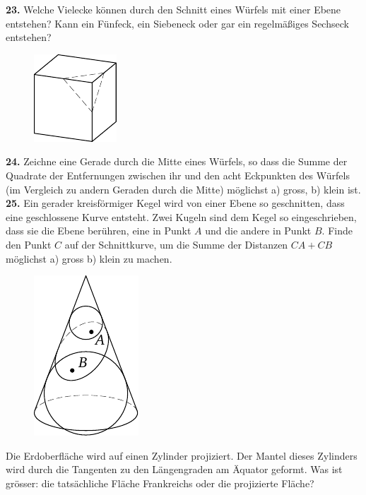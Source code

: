 \documentclass[12pt]{article} %
\begin{document}
\newpage
\noindent
{\bf 23.} Welche Vielecke können durch den Schnitt eines Würfels mit einer Ebene entstehen? Kann ein Fünfeck, ein Siebeneck oder gar ein regelmäßiges Sechseck entstehen? 
\begin{figure}[h]
\centering
\footnotesize
\includegraphics[scale=1]{taskbook-7}
\end{figure}
\newline\newline\quad
{\bf 24.} Zeichne eine Gerade durch die Mitte eines Würfels, so dass die Summe der Quadrate der Entfernungen zwischen ihr und den acht Eckpunkten des Würfels (im Vergleich zu andern Geraden durch die Mitte) möglichst a) gross, b) klein ist.
\newline\newline\quad
{\bf 25.} Ein gerader kreisförmiger Kegel wird von einer Ebene so geschnitten, dass eine geschlossene Kurve entsteht. Zwei Kugeln sind dem Kegel so eingeschrieben, dass sie die Ebene berühren, eine in Punkt $A$ und die andere in Punkt $B$. Finde den Punkt $C$ auf der Schnittkurve, um die Summe der Distanzen $CA + CB$ möglichst a) gross b) klein zu machen. 
\begin{figure}[h]
\centering
\footnotesize
\includegraphics[scale=1]{taskbook-9}
\end{figure} 
\newline\newline{} Die Erdoberfläche wird auf einen Zylinder projiziert. Der Mantel dieses Zylinders wird durch die Tangenten zu den Längengraden am Äquator geformt. Was ist grösser: die tatsächliche Fläche Frankreichs oder die projizierte Fläche?
\end{document}
